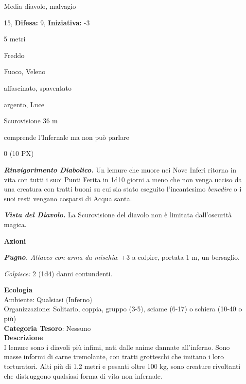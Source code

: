 \begin{multicols}{2}
{
\noindent
\begin{description}[noitemsep, topsep=0pt, parsep=0pt, partopsep=0pt, leftmargin=0cm, labelwidth=2.2cm]
	\item[\textbf{Taglia/Tipo:}] Media diavolo, malvagio
	\item[\textbf{Caratt.:}] 
	\item[\textbf{Punti Ferita:}] 15,  \textbf{Difesa:} 9,  \textbf{Iniziativa:} -3
	\item[\textbf{Movimento:}] 5 metri
	\item[\textbf{Tiri Salvez.:}] 
	\item[\textbf{Res. Danni:}] Freddo
	\item[\textbf{Imm. Danni:}] Fuoco, Veleno
	\item[\textbf{Immunità:}] affascinato, spaventato
	\item[\textbf{Vulnerabilità:}] argento, Luce
	\item[\textbf{Sensi:}] Scurovisione 36 m
	\item[\textbf{Linguaggi:}] comprende l'Infernale ma non può parlare
	\item[\textbf{Sfida:}] 0 (10 PX)\smallskip
\end{description}

\emph{\textbf{Rinvigorimento Diabolico.}} Un lemure che muore nei Nove Inferi ritorna in vita con tutti i suoi Punti Ferita in 1d10 giorni a meno che non venga ucciso da una creatura con tratti buoni su cui sia stato eseguito l'incantesimo \emph{benedire} o i suoi resti vengano cosparsi di Acqua santa.

\emph{\textbf{Vista del Diavolo.}} La Scurovisione del diavolo non è limitata dall'oscurità magica.

\textbf{Azioni}

\emph{\textbf{Pugno.} Attacco con arma da mischia}: +3 a colpire, portata 1 m, un bersaglio.

\emph{Colpisce:} 2 (1d4) danni contundenti.

\textbf{Ecologia}\\
Ambiente: Qualsiasi (Inferno)\\
Organizzazione: Solitario, coppia, gruppo (3-5), sciame (6-17) o schiera (10-40 o più)\\
\textbf{Categoria Tesoro}: Nessuno\\
\textbf{Descrizione}\\
I lemure sono i diavoli più infimi, nati dalle anime dannate all'inferno. Sono masse informi di carne tremolante, con tratti grotteschi che imitano i loro torturatori. Alti più di 1,2 metri e pesanti oltre 100 kg, sono creature rivoltanti che distruggono qualsiasi forma di vita non infernale.

}
\end{multicols}
